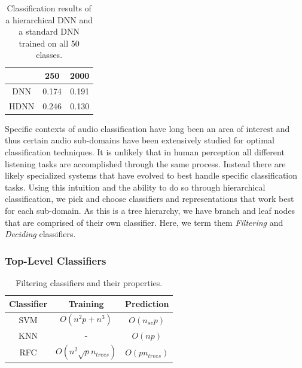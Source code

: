 \begin{table}[t]
    \centering
    \begin{tabular}{ccc}
         & 250   & 2000  \\ \hline
    DNN  & 0.174 & 0.191 \\
    HDNN & 0.246 & 0.130
    \end{tabular}
    \caption{Classification results of a hierarchical DNN and a standard DNN trained on all 50 classes.}
    \label{tab:classifier}
\end{table}


Specific contexts of audio classification have long been an area of interest and thus certain audio sub-domains have been extensively studied for optimal classification techniques. It is unlikely that in human perception all different listening tasks are accomplished through the same process. Instead there are likely specialized systems that have evolved to best handle specific classification tasks. Using this intuition and the ability to do so through hierarchical classification, we pick and choose classifiers and representations that work best for each sub-domain. As this is a tree hierarchy, we have branch and leaf nodes that are comprised of their own classifier. Here, we term them \textit{Filtering} and \textit{Deciding} classifiers.

\subsubsection{Top-Level Classifiers}

\begin{table}[h]
    \begin{tabular}{c|cc}
        Classifier & Training & Prediction \\ \hline
        SVM & $O(n^2p+n^3)$ & $O(n_{sv}p)$ \\
        KNN & - & $O(np)$ \\
        RFC & $O(n^2\sqrt{p}n_{trees})$ & $O(pn_{trees})$
    \end{tabular}
\caption{Filtering classifiers and their properties.}
\label{tab:filt-class}
\end{table}


